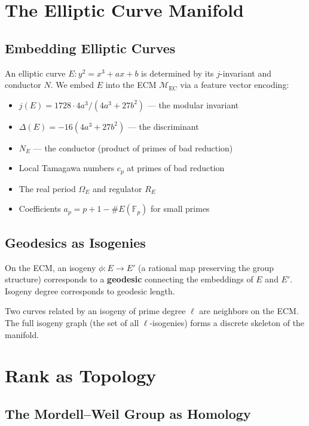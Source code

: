 \documentclass{article}
\begin{document}
\section{The Elliptic Curve Manifold}
\label{sec:ecm}

\subsection{Embedding Elliptic Curves}

An elliptic curve $E: y^2 = x^3 + ax + b$ is determined by its
$j$-invariant and conductor $N$.  We embed $E$ into the ECM
$\mathcal{M}_{\mathrm{EC}}$ via a feature vector encoding:

\begin{itemize}
  \item $j(E) = 1728 \cdot 4a^3/(4a^3 + 27b^2)$ --- the modular invariant
  \item $\Delta(E) = -16(4a^3 + 27b^2)$ --- the discriminant
  \item $N_E$ --- the conductor (product of primes of bad reduction)
  \item Local Tamagawa numbers $c_p$ at primes of bad reduction
  \item The real period $\Omega_E$ and regulator $R_E$
  \item Coefficients $a_p = p + 1 - \#E(\mathbb{F}_p)$ for small primes
\end{itemize}

\subsection{Geodesics as Isogenies}

On the ECM, an isogeny $\phi: E \to E'$ (a rational map preserving the
group structure) corresponds to a \textbf{geodesic} connecting the
embeddings of $E$ and $E'$.  Isogeny degree corresponds to geodesic length.

Two curves related by an isogeny of prime degree $\ell$ are neighbors on
the ECM.  The full isogeny graph (the set of all $\ell$-isogenies) forms
a discrete skeleton of the manifold.

\section{Rank as Topology}
\label{sec:rank-topology}

\subsection{The Mordell--Weil Group as Homology}
\end{document}
